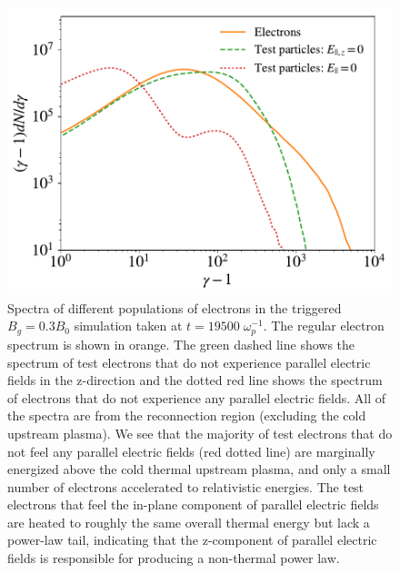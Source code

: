 \begin{figure}[htp] 
\includegraphics[width=\linewidth]{final_testprtl_bguide3_triggered065.pdf}
\caption{Spectra of different populations of electrons in the triggered $B_{g}=0.3B_{0}$ simulation taken at $t=19500 \; \omega_{p}^{-1}$.  The regular electron spectrum is shown in orange.  The green dashed line shows the spectrum of test electrons that do not experience parallel electric fields in the z-direction and the dotted red line shows the spectrum of electrons that do not experience any parallel electric fields.  All of the spectra are from the reconnection region (excluding the cold upstream plasma).  We see that the majority of test electrons that do not feel any parallel electric fields (red dotted line) are marginally energized above the cold thermal upstream plasma, and only a small number of electrons accelerated to relativistic energies.  The test electrons that feel the in-plane component of parallel electric fields are heated to roughly the same overall thermal energy but lack a power-law tail, indicating that the z-component of parallel electric fields is responsible for producing a non-thermal power law.}
\label{testprtl_spec}
\end{figure}

